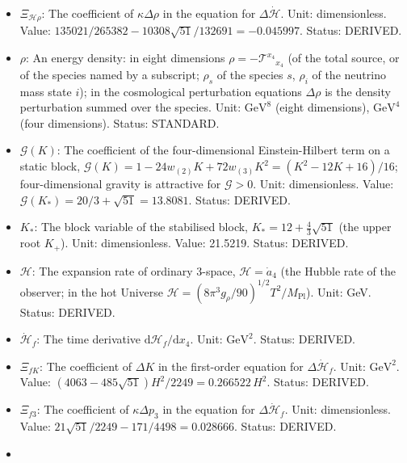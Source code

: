 \documentclass[
  10pt,
]{article}
\begin{document}
\begin{itemize}
  \(\bar p = (p_0 + 3p_5)/4\); for a species at fixed temperature
  \(\bar p = \frac14\,\partial p/\partial\ln f\). Unit:
  \(\mathrm{GeV}^{8}\) (or \(\mathrm{GeV}^{4}\) for a four-dimensional
  density). Status: DERIVED.
\item
  \(\Xi_{\mathcal{H}\rho}\): The coefficient of \(\kappa\Delta\rho\) in
  the equation for \(\Delta\dot{\mathcal{H}}\). Unit: dimensionless.
  Value: \(135021/265382 - 10308\sqrt{51}/132691 = -0.045997\). Status:
  DERIVED.
\item
  \(\rho\): An energy density: in eight dimensions
  \(\rho = -\mathcal{T}^{x_4}{}_{x_4}\) (of the total source, or of the
  species named by a subscript; \(\rho_s\) of the species \(s\),
  \(\rho_i\) of the neutrino mass state \(i\)); in the cosmological
  perturbation equations \(\Delta\rho\) is the density perturbation
  summed over the species. Unit: \(\mathrm{GeV}^{8}\) (eight
  dimensions), \(\mathrm{GeV}^{4}\) (four dimensions). Status: STANDARD.
\item
  \(\mathcal{G}(K)\): The coefficient of the four-dimensional
  Einstein-Hilbert term on a static block,
  \(\mathcal{G}(K) = 1 - 24w_{(2)}K + 72w_{(3)}K^2 = (K^2 - 12K + 16)/16\);
  four-dimensional gravity is attractive for \(\mathcal{G} > 0\). Unit:
  dimensionless. Value:
  \(\mathcal{G}(K_*) = 20/3 + \sqrt{51} = 13.8081\). Status: DERIVED.
\item
  \(K_*\): The block variable of the stabilised block,
  \(K_* = 12 + \frac43\sqrt{51}\) (the upper root \(K_+\)). Unit:
  dimensionless. Value: 21.5219. Status: DERIVED.
\item
  \(\mathcal{H}\): The expansion rate of ordinary 3-space,
  \(\mathcal{H} = \dot a_4\) (the Hubble rate of the observer; in the
  hot Universe
  \(\mathcal{H} = (8\pi^3g_\rho/90)^{1/2}T^2/M_{\mathrm{Pl}}\)). Unit:
  GeV. Status: DERIVED.
\item
  \(\dot{\mathcal{H}}_f\): The time derivative
  \(\mathrm{d}\mathcal{H}_f/\mathrm{d}x_4\). Unit: \(\mathrm{GeV}^{2}\).
  Status: DERIVED.
\item
  \(\Xi_{fK}\): The coefficient of \(\Delta K\) in the first-order
  equation for \(\Delta\dot{\mathcal{H}}_f\). Unit:
  \(\mathrm{GeV}^{2}\). Value:
  \((4063 - 485\sqrt{51})H^2/2249 = 0.266522\,H^2\). Status: DERIVED.
\item
  \(\Xi_{f3}\): The coefficient of \(\kappa\Delta p_3\) in the equation
  for \(\Delta\dot{\mathcal{H}}_f\). Unit: dimensionless. Value:
  \(21\sqrt{51}/2249 - 171/4498 = 0.028666\). Status: DERIVED.
\item

\end{itemize}
\end{document}
